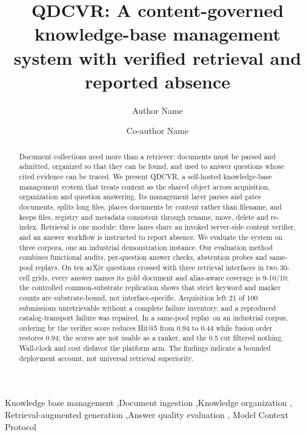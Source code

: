 \documentclass[final,5p,times,twocolumn]{elsarticle}
\begin{document}
\begin{frontmatter}

\title{QDCVR: A content-governed knowledge-base management system with
verified retrieval and reported absence}

\author[inst1]{Author Name}
\author[inst1]{Co-author Name}

\begin{abstract}
Document collections need more than a retriever: documents must be
parsed and admitted, organized so that they can be found, and used to answer
questions whose cited evidence can be traced. We present QDCVR, a self-hosted
knowledge-base management system that treats content as the shared object
across acquisition, organization and question answering. Its management layer
parses and gates documents, splits long files, places
documents by content rather than filename, and keeps files, registry and
metadata consistent through rename, move, delete and re-index. Retrieval is one
module: three lanes share an invoked server-side content verifier, and an
answer workflow is instructed to report absence.
We evaluate the system on three corpora, one an industrial demonstration
instance. Our evaluation method combines functional audits, per-question
answer checks, abstention probes and same-pool replays.
On ten arXiv
questions crossed with three retrieval interfaces in two 30-cell grids, every
answer names its gold document and alias-aware coverage is 9-10/10; the
controlled common-substrate replication shows that strict keyword and marker
counts are substrate-bound, not interface-specific. Acquisition left 21 of 100 submissions unretrievable without a
complete failure inventory, and a reproduced catalog-transport failure was
repaired. In a same-pool replay on an industrial corpus, ordering
by the verifier score reduces Hit@5 from 0.94 to 0.44 while fusion order
restores 0.94; the scores are not usable as a ranker, and the 0.5 cut filtered
nothing. Wall-clock and cost disfavor the
platform arm. The findings indicate a bounded deployment account,
not universal retrieval superiority.
\end{abstract}

\begin{keyword}
Knowledge base management \sep Document ingestion \sep Knowledge organization \sep
Retrieval-augmented generation \sep Answer quality evaluation \sep
Model Context Protocol
\end{keyword}

\end{frontmatter}
\end{document}
